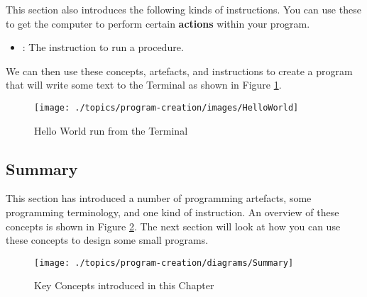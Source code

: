 This section also introduces the following kinds of instructions. You can use these to get the computer to perform certain \textbf{actions} within your program.
\begin{itemize}
  \item {}: The instruction to run a procedure.
\end{itemize}

We can then use these concepts, artefacts, and instructions to create a program that will write some text to the Terminal as shown in Figure \ref{fig:program-creation-helloworld}.

\begin{figure}[h]
   \centering
   \texttt{[image: ./topics/program-creation/images/HelloWorld]} 
   \caption[Hello World Terminal]{Hello World run from the Terminal}
   \label{fig:program-creation-helloworld}
\end{figure}














\clearpage
\subsection{Summary} %
\label{sub:program_creation_concepts_summary}

This section has introduced a number of programming artefacts, some programming terminology, and one kind of instruction. An overview of these concepts is shown in Figure \ref{fig:program-creation-summary}. The next section will look at how you can use these concepts to design some small programs.

\begin{figure}[h]
   \centering
   \texttt{[image: ./topics/program-creation/diagrams/Summary]} 
   \caption[Chapter Concepts]{Key Concepts introduced in this Chapter}
   \label{fig:program-creation-summary}
\end{figure}


